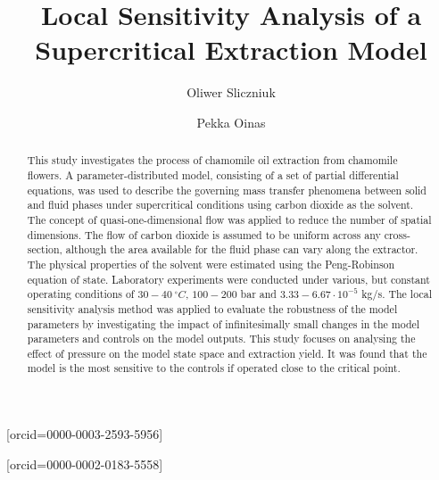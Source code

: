 \documentclass[a4paper,fleqn]{cas-dc}
\begin{document}
 
	
	\title[mode=title]{Local Sensitivity Analysis of a Supercritical Extraction Model}                      
	
	
	\author[1]{Oliwer Sliczniuk}[orcid=0000-0003-2593-5956]
	\cormark[1]
	
	\author[1]{Pekka Oinas}[orcid=0000-0002-0183-5558]
	
	
	\address[1]{Aalto University, School of Chemical Engineering, Espoo, 02150, Finland}
	
	
	\begin{abstract}
		This study investigates the process of chamomile oil extraction from chamomile flowers. A parameter-distributed model, consisting of a set of partial differential equations, was used to describe the governing mass transfer phenomena between solid and fluid phases under supercritical conditions using carbon dioxide as the solvent. The concept of quasi-one-dimensional flow was applied to reduce the number of spatial dimensions. The flow of carbon dioxide is assumed to be uniform across any cross-section, although the area available for the fluid phase can vary along the extractor. The physical properties of the solvent were estimated using the Peng-Robinson equation of state. Laboratory experiments were conducted under various, but constant operating conditions of $30 - 40~^\circ C$, $100 - 200$ bar and $3.33-6.67 \cdot 10^{-5}$ kg/s. The local sensitivity analysis method was applied to evaluate the robustness of the model parameters by investigating the impact of infinitesimally small changes in the model parameters and controls on the model outputs. This study focuses on analysing the effect of pressure on the model state space and extraction yield. {\color{blue}It was found that the model is the most sensitive to the controls if operated close to the critical point.}
		
	\end{abstract}
	
\end{document}
